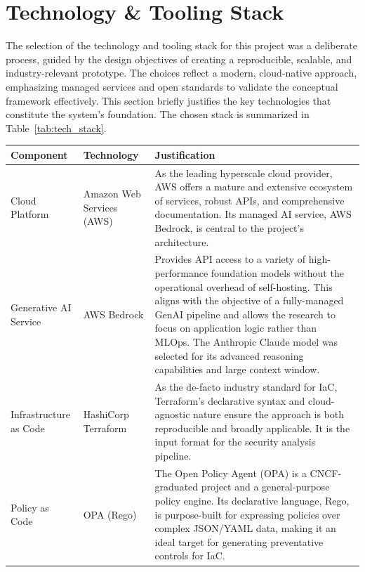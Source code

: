 \section{Technology \& Tooling Stack}

The selection of the technology and tooling stack for this project was a deliberate process, guided by the design objectives of creating a reproducible, scalable, and industry-relevant prototype. The choices reflect a modern, cloud-native approach, emphasizing managed services and open standards to validate the conceptual framework effectively. This section briefly justifies the key technologies that constitute the system's foundation. The chosen stack is summarized in Table~\ref{tab:tech_stack}.

\begin{center}
\begin{tabular}{|l|l|p{7cm}|}
\hline
\textbf{Component} & \textbf{Technology} & \textbf{Justification} \\
\hline
Cloud Platform & Amazon Web Services (AWS) \cite{noauthor_welcome_nodate} & As the leading hyperscale cloud provider, AWS offers a mature and extensive ecosystem of services, robust APIs, and comprehensive documentation. Its managed AI service, AWS Bedrock, is central to the project's architecture. \\
\hline
Generative AI Service & AWS Bedrock \cite{noauthor_claude_nodate} & Provides API access to a variety of high-performance foundation models without the operational overhead of self-hosting. This aligns with the objective of a fully-managed GenAI pipeline and allows the research to focus on application logic rather than MLOps. The Anthropic Claude model was selected for its advanced reasoning capabilities and large context window. \\
\hline
Infrastructure as Code & HashiCorp Terraform \cite{noauthor_terraform_nodate} & As the de-facto industry standard for IaC, Terraform's declarative syntax and cloud-agnostic nature ensure the approach is both reproducible and broadly applicable. It is the input format for the security analysis pipeline. \\
\hline
Policy as Code & OPA (Rego) \cite{noauthor_introduction_nodate} & The Open Policy Agent (OPA) is a CNCF-graduated project and a general-purpose policy engine. Its declarative language, Rego, is purpose-built for expressing policies over complex JSON/YAML data, making it an ideal target for generating preventative controls for IaC. \\
\hline

\end{tabular}
\end{center}
